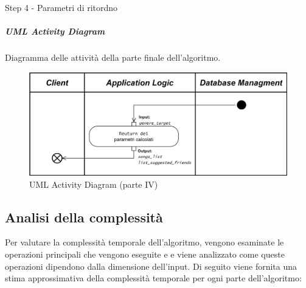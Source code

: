 \begin{algorithm}

    \caption{Step 4 - Parametri di ritordno}
    \SetAlgoLined
   
\end{algorithm}
\vspace{1cm}
\subparagraph{UML Activity Diagram}
Diagramma delle attività della parte finale dell'algoritmo.
\vspace{0.3cm}
\begin{figure} [H]
    \centering
    \includegraphics[scale=0.8]{images/flowchart_4_UML_ver2.png}
    \caption{UML Activity Diagram (parte IV)}
    \label{fig-uml-ac-4}
\end{figure}




\newpage
\subsection{Analisi della complessità}
Per valutare la complessità temporale dell'algoritmo, vengono esaminate le operazioni principali che 
vengono eseguite e e viene analizzato come queste operazioni dipendono dalla dimensione dell'input. 
Di seguito viene fornita una stima approssimativa della complessità temporale per ogni parte dell'algoritmo:

